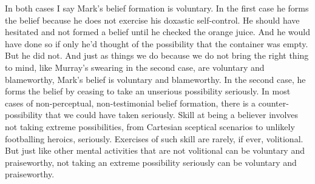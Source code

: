 \documentclass[
  11pt,
  letterpaper,
  DIV=11,
  numbers=noendperiod,
  oneside]{scrartcl}
\begin{document}
In both cases I say Mark's belief formation is voluntary. In the first
case he forms the belief because he does not exercise his doxastic
self-control. He should have hesitated and not formed a belief until he
checked the orange juice. And he would have done so if only he'd thought
of the possibility that the container was empty. But he did not. And
just as things we do because we do not bring the right thing to mind,
like Murray's swearing in the second case, are voluntary and
blameworthy, Mark's belief is voluntary and blameworthy. In the second
case, he forms the belief by ceasing to take an unserious possibility
seriously. In most cases of non-perceptual, non-testimonial belief
formation, there is a counter-possibility that we could have taken
seriously. Skill at being a believer involves not taking extreme
possibilities, from Cartesian sceptical scenarios to unlikely
footballing heroics, seriously. Exercises of such skill are rarely, if
ever, volitional. But just like other mental activities that are not
volitional can be voluntary and praiseworthy, not taking an extreme
possibility seriously can be voluntary and praiseworthy.
\end{document}
